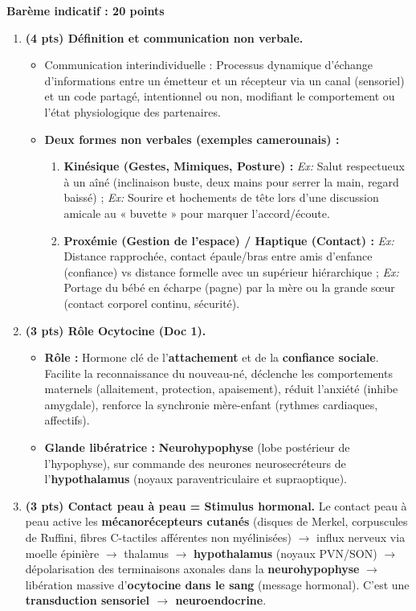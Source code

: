 \documentclass[11pt]{article}
\newcommand{\cle}[1]{{\popxbold\color{popdark}#1}}
\begin{document}
\begin{corrige}
\textbf{Barème indicatif : 20 points}
\begin{enumerate}
\item \textbf{(4 pts) Définition et communication non verbale.}
\begin{itemize}
\item \cle{Communication interindividuelle} : Processus dynamique d'échange d'informations entre un émetteur et un récepteur via un canal (sensoriel) et un code partagé, intentionnel ou non, modifiant le comportement ou l'état physiologique des partenaires.
\item \textbf{Deux formes non verbales (exemples camerounais) :}
\begin{enumerate}
\item \textbf{Kinésique (Gestes, Mimiques, Posture) :} \textit{Ex:} Salut respectueux à un aîné (inclinaison buste, deux mains pour serrer la main, regard baissé) ; \textit{Ex:} Sourire et hochements de tête lors d'une discussion amicale au « buvette » pour marquer l'accord/écoute.
\item \textbf{Proxémie (Gestion de l'espace) / Haptique (Contact) :} \textit{Ex:} Distance rapprochée, contact épaule/bras entre amis d'enfance (confiance) vs distance formelle avec un supérieur hiérarchique ; \textit{Ex:} Portage du bébé en écharpe (pagne) par la mère ou la grande sœur (contact corporel continu, sécurité).
\end{enumerate}
\end{itemize}
\item \textbf{(3 pts) Rôle Ocytocine (Doc 1).}
\begin{itemize}
\item \textbf{Rôle :} Hormone clé de l'\textbf{attachement} et de la \textbf{confiance sociale}. Facilite la reconnaissance du nouveau-né, déclenche les comportements maternels (allaitement, protection, apaisement), réduit l'anxiété (inhibe amygdale), renforce la synchronie mère-enfant (rythmes cardiaques, affectifs).
\item \textbf{Glande libératrice :} \textbf{Neurohypophyse} (lobe postérieur de l'hypophyse), sur commande des neurones neurosecréteurs de l'\textbf{hypothalamus} (noyaux paraventriculaire et supraoptique).
\end{itemize}
\item \textbf{(3 pts) Contact peau à peau = Stimulus hormonal.}
Le contact peau à peau active les \textbf{mécanorécepteurs cutanés} (disques de Merkel, corpuscules de Ruffini, fibres C-tactiles afférentes non myélinisées) $\to$ influx nerveux via moelle épinière $\to$ thalamus $\to$ \textbf{hypothalamus} (noyaux PVN/SON) $\to$ dépolarisation des terminaisons axonales dans la \textbf{neurohypophyse} $\to$ libération massive d'\textbf{ocytocine dans le sang} (message hormonal). C'est une \textbf{transduction sensoriel $\to$ neuroendocrine}.

\end{enumerate}
\end{corrige}
\end{document}

